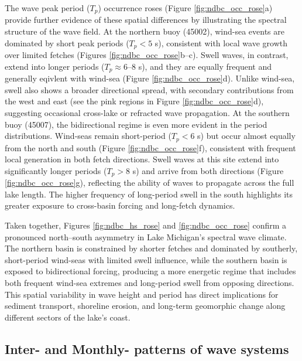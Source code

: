 The wave peak period ($T_p$) occurrence roses (Figure \ref{fig:ndbc_occ_rose}a)
provide further evidence of these spatial differences by illustrating the
spectral structure of the wave field. At the northern buoy (45002), wind-sea
events are dominated by short peak periods ($T_p < 5$ s), consistent with local
wave growth over limited fetches (Figures \ref{fig:ndbc_occ_rose}b–c). Swell
waves, in contrast, extend into longer periods ($T_p \approx 6$–8 s), and they
are equally frequent and generally eqivlent with wind-sea (Figure
\ref{fig:ndbc_occ_rose}d). Unlike wind-sea, swell also shows a broader
directional spread, with secondary contributions from the west and east (see the
pink regions in Figure \ref{fig:ndbc_occ_rose}d), suggesting occasional
cross-lake or refracted wave propagation. At the southern buoy (45007), the
bidirectional regime is even more evident in the period distributions. Wind-seas
remain short-period ($T_p < 6$ s) but occur almost equally from the north and
south (Figure \ref{fig:ndbc_occ_rose}f), consistent with frequent local
generation in both fetch directions. Swell waves at this site extend into
significantly longer periods ($T_p > 8$ s) and arrive from both directions
(Figure \ref{fig:ndbc_occ_rose}g), reflecting the ability of waves to propagate
across the full lake length. The higher frequency of long-period swell in the
south highlights its greater exposure to cross-basin forcing and long-fetch
dynamics.

Taken together, Figures \ref{fig:ndbc_hs_rose} and \ref{fig:ndbc_occ_rose}
confirm a pronounced north–south asymmetry in Lake Michigan’s spectral wave
climate. The northern basin is constrained by shorter fetches and dominated by
southerly, short-period wind-seas with limited swell influence, while the
southern basin is exposed to bidirectional forcing, producing a more energetic
regime that includes both frequent wind-sea extremes and long-period swell from
opposing directions. This spatial variability in wave height and period has
direct implications for sediment transport, shoreline erosion, and long-term
geomorphic change along different sectors of the lake’s coast.

\subsection{Inter- and Monthly- patterns of wave systems}
\label{Inter- and Monthly- patterns of wave systems}

